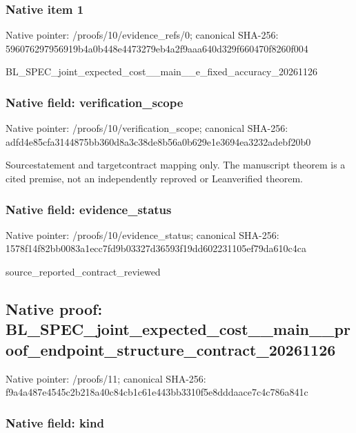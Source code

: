 \documentclass[10pt,a4paper]{article}
\begin{document}
\subsubsection{Native item 1}


Native pointer: /proofs/10/evidence\_refs/0; canonical SHA-256: 596076297956919b4a0b448e\allowbreak{}4473279eb4a2f9aaa640d329\allowbreak{}f660470f8260f004


BL\_SPEC\_joint\_expected\_c\allowbreak{}ost\_\_main\_\_e\_fixed\_accur\allowbreak{}acy\_20261126


\subsubsection{Native field: verification\_scope}


Native pointer: /proofs/10/verification\_scope; canonical SHA-256: adfd4e85cfa3144875bb360d\allowbreak{}8a3c38de8b56a0b629e1e369\allowbreak{}4ea3232adebf20b0


Sourcestatement and targetcontract mapping only. The manuscript theorem is a cited premise, not an independently reproved or Leanverified theorem.


\subsubsection{Native field: evidence\_status}


Native pointer: /proofs/10/evidence\_status; canonical SHA-256: 1578f14f82bb0083a1ecc7fd\allowbreak{}9b03327d36593f19dd602231\allowbreak{}105ef79da610c4ca


source\_reported\_contract\_reviewed


\subsection{Native proof: BL\_SPEC\_joint\_expected\_c\allowbreak{}ost\_\_main\_\_proof\_endpoin\allowbreak{}t\_structure\_contract\_202\allowbreak{}61126}


Native pointer: /proofs/11; canonical SHA-256: f9a4a487e4545c2b218a40c8\allowbreak{}4cb1c61e443bb3310f5e8ddd\allowbreak{}aace7c4c786a841c



\subsubsection{Native field: kind}
\end{document}
